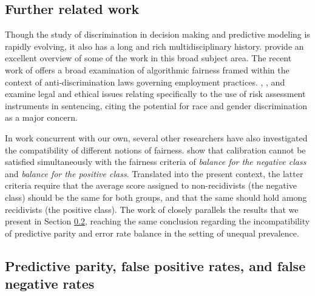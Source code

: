 \documentclass[11pt, svgnames]{article}
\numberwithin{equation}{section}
\theoremstyle{plain}
\theoremstyle{definition}
\numberwithin{prop}{section}
\numberwithin{corollary}{section}
\begin{document}
 \subsection{Further related work}

Though the study of discrimination in decision making and predictive modeling is rapidly evolving, it also has a long and rich multidisciplinary history.   \citet*{romei2014multidisciplinary} provide an excellent overview of some of the work in this broad subject area.  The recent work of \citet*{barocas2016big} offers a broad examination of algorithmic fairness framed within the context of anti-discrimination laws governing employment practices.  \citet{hannah2013actuarial}, \citet{skeem2013risk}, and \citet{monahan2016risk} examine legal and ethical issues relating specifically to the use of risk assessment instruments in sentencing, citing the potential for race and gender discrimination as a major concern.

In work concurrent with our own, several other researchers have also investigated the compatibility of different notions of fairness.  \citet{kleinberg2016inherent} show that calibration cannot be satisfied simultaneously with the fairness criteria of \emph{balance for the negative class} and \emph{balance for the positive class}.  Translated into the present context, the latter criteria require that the average score assigned to non-recidivists (the negative class) should be the same for both groups, and that the same should hold among recidivists (the positive class).
The work of \citet{corbett-davies-2016} closely parallels the results that we present in Section \ref{sec:incompatibility}, reaching the same conclusion regarding the incompatibility of predictive parity and error rate balance in the setting of unequal prevalence.  




  \subsection{Predictive parity, false positive rates, and false negative rates} \label{sec:incompatibility}
  
\end{document}
